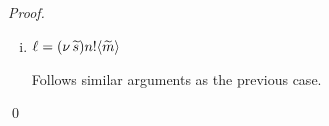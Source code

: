 \begin{proof}
\begin{enumerate}
\begin{enumerate}[i.]
				\item	$\ell = (\nu\, \widetilde{s}) n ! \langle \widetilde{m} \rangle$

						\noi Follows similar arguments as the previous case.
			\end{enumerate}
\end{enumerate}
	\qed
\end{proof}


%



